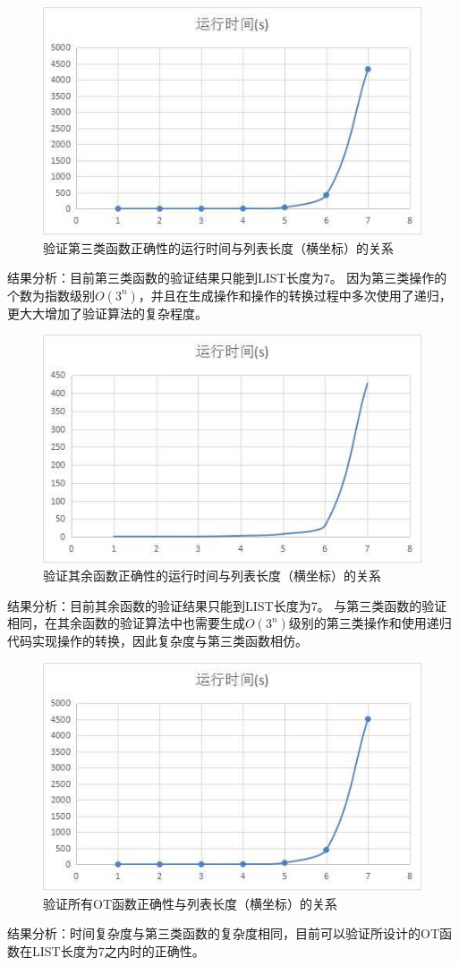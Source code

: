 \begin{figure}[H]
\centering
\includegraphics{figures/runtime3.jpg}
\caption{验证第三类函数正确性的运行时间与列表长度（横坐标）的关系}
\end{figure}
\par 结果分析：目前第三类函数的验证结果只能到LIST长度为7。
因为第三类操作的个数为指数级别$O(3^n)$，并且在生成操作和操作的转换过程中多次使用了递归，更大大增加了验证算法的复杂程度。

\begin{figure}[H]
\centering
\includegraphics{figures/runtime4.jpg}
\caption{验证其余函数正确性的运行时间与列表长度（横坐标）的关系}
\end{figure}
\par 结果分析：目前其余函数的验证结果只能到LIST长度为7。
与第三类函数的验证相同，在其余函数的验证算法中也需要生成$O(3^n)$级别的第三类操作和使用递归代码实现操作的转换，因此复杂度与第三类函数相仿。

\begin{figure}[H]
\centering
\includegraphics{figures/runtimeall.jpg}
\caption{验证所有OT函数正确性与列表长度（横坐标）的关系}
\end{figure}
\par 结果分析：时间复杂度与第三类函数的复杂度相同，目前可以验证所设计的OT函数在LIST长度为7之内时的正确性。
